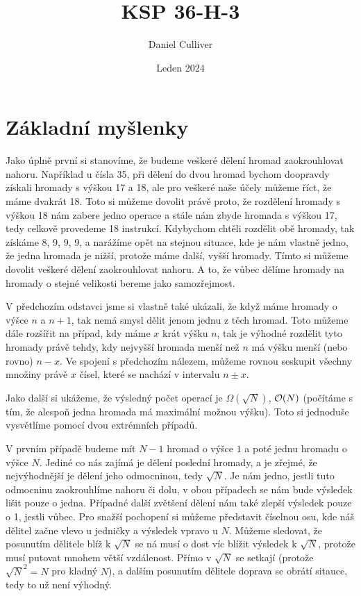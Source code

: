 \documentclass{../../../ksp}
\title{KSP 36-H-3}
\author{Daniel Culliver}
\date{Leden 2024}
\begin{document}
\maketitle

\section*{Základní myšlenky}

Jako úplně první si stanovíme, že budeme veškeré dělení hromad zaokrouhlovat nahoru. Například u čísla 35, při dělení do dvou hromad bychom doopravdy získali hromady s výškou 17 a 18, ale pro veškeré naše účely můžeme říct, že máme dvakrát 18.
Toto si můžeme dovolit právě proto, že rozdělení hromady s výškou 18 nám zabere jedno operace a stále nám zbyde hromada s výškou 17, tedy celkově provedeme 18 instrukcí.
Kdybychom chtěli rozdělit obě hromady, tak získáme 8, 9, 9, 9, a narážíme opět na stejnou situace, kde je nám vlastně jedno, že jedna hromada je nižší, protože máme další, vyšší hromady.
Tímto si můžeme dovolit veškeré dělení zaokrouhlovat nahoru.
A to, že vůbec dělíme hromady na hromady o stejné velikosti bereme jako samozřejmost.

V předchozím odstavci jsme si vlastně také ukázali, že když máme hromady o výšce $n$ a $n+1$, tak nemá smysl dělit jenom jednu z těch hromad. 
Toto můžeme dále rozšířit na případ, kdy máme $x$ krát výšku $n$, tak je výhodné rozdělit tyto hromady právě tehdy, kdy nejvyšší hromada menší než $n$ má výšku menší (nebo rovno) $n-x$.
Ve spojení s předchozím nálezem, můžeme rovnou seskupit všechny množiny právě $x$ čísel, které se nachází v intervalu $n \pm x$.

Jako další si ukážeme, že výsledný počet operací je $\Omega (\sqrt{N})$, $\mathcal{O} (N)$ (počítáme s tím, že alespoň jedna hromada má maximální možnou výšku).
Toto si jednoduše vysvětlíme pomocí dvou extrémních případů.

V prvním případě budeme mít $N-1$ hromad o výšce $1$ a poté jednu hromadu o výšce $N$.
Jediné co nás zajímá je dělení poslední hromady, a je zřejmé, že nejvýhodnější je dělení jeho odmocninou, tedy $\sqrt{N}$.
Je nám jedno, jestli tuto odmocninu zaokrouhlíme nahoru či dolu, v obou případech se nám bude výsledek lišit pouze o jedna.
Případné další zvětšení dělení nám také zlepší výsledek pouze o 1, jestli vůbec.
Pro snažší pochopení si můžeme představit číselnou osu, kde náš dělitel začne vlevo u jedničky a výsledek vpravo u $N$.
Můžeme sledovat, že posunutím dělitele blíž k $\sqrt{N}$ se ná musí o dost víc blížit výsledek k $\sqrt{N}$, protože musí putovat mnohem větší vzdálenost.
Přímo v $\sqrt{N}$ se setkají (protože $\sqrt{N}^2 = N$ pro kladný $N$), a dalším posunutím dělitele doprava se obrátí sitauce, tedy to už není výhodný.
\end{document}
